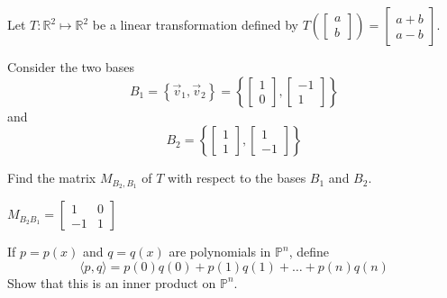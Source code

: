 \documentclass{ximera}
\begin{document}
\begin{problem}\label{prb:10.106}
Let $T: \mathbb{R}^2 \mapsto \mathbb{R}^2$ be a linear transformation defined by $T \left( \left[ \begin{array}{r}
a \\
b
\end{array} \right] \right) = \left[ \begin{array}{r}
a+b \\
a-b
\end{array} \right]$.

Consider the two bases
\[
B_1 = \left\{ \vec{v}_{1}, \vec{v}_{2} \right\} = \left\{ \left[ \begin{array}{r}
1 \\
0
\end{array}\right], \left[ \begin{array}{r}
-1 \\
1
\end{array}
\right]
\right\}
\]
 and
\[
B_2 = \left\{ \left[ \begin{array}{r}
1 \\
1
\end{array}
\right], \left[ \begin{array}{r}
1 \\
-1
\end{array}
\right]
\right\}
\]

Find the matrix $M_{B_2,B_1}$ of $T$ with respect to the bases $B_1$ and $B_2$.
\begin{hint}
$
M_{B_{2} B_{1}} = \left[
\begin{array}{rr}
 1 & 0 \\
 -1 & 1
\end{array}
\right] $
\end{hint}
\end{problem}

\begin{problem}\label{prob:inner_prod_7}
If $p = p(x)$ and $q = q(x)$ are polynomials in $\mathbb{P}^{n}$, define
\begin{equation*}
\langle p, q \rangle = p(0)q(0) + p(1)q(1) + \dots + p(n)q(n)
\end{equation*}
Show that this is an inner product on $\mathbb{P}^{n}$.
\end{problem}
\end{document}
